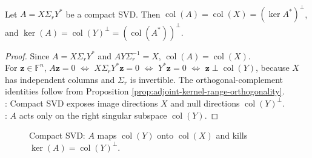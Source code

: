 \begin{theorem} \label{thm:compact-svd-subspaces} \\
Let $A=X\Sigma_rY^*$ be a compact SVD. Then $\operatorname{col}(A)=\operatorname{col}(X)=(\ker A^*)^{\perp}$, and $\ker(A)=\operatorname{col}(Y)^{\perp}=(\operatorname{col}(A^*))^{\perp}$.
\begin{proof}
Since $A=X\Sigma_rY^*$ and $AY\Sigma_r^{-1}=X$, $\operatorname{col}(A)=\operatorname{col}(X)$.\\
For $\mathbf{z}\in\mathbb{F}^n$, $A\mathbf{z}=0$ $\Longleftrightarrow$ $X\Sigma_rY^*\mathbf{z}=0$ $\Longleftrightarrow$ $Y^*\mathbf{z}=0$ $\Longleftrightarrow$ $\mathbf{z}\perp\operatorname{col}(Y)$, because $X$ has independent columns and $\Sigma_r$ is invertible. The orthogonal-complement identities follow from Proposition \ref{prop:adjoint-kernel-range-orthogonality}.\\
: Compact SVD exposes image directions $X$ and null directions $\operatorname{col}(Y)^\perp$.\\
: $A$ acts only on the right singular subspace $\operatorname{col}(Y)$.
\end{proof}
\end{theorem}

\begin{figure}[H]
  \centering
  
  \caption{Compact SVD: $A$ maps $\operatorname{col}(Y)$ onto $\operatorname{col}(X)$ and kills $\ker(A)=\operatorname{col}(Y)^\perp$.}
  \label{fig:compact-svd-subspaces}
\end{figure}

